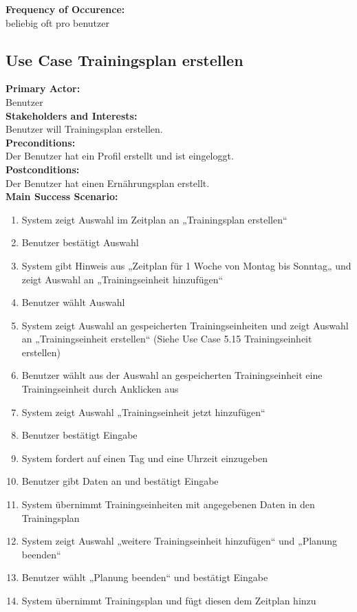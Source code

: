 \documentclass[12pt,a4paper,onecolumn]{article}
\begin{document}
\textbf{Frequency of Occurence:}\\beliebig oft pro benutzer \\

\subsection{Use Case Trainingsplan erstellen}
\textbf{Primary Actor:}\\ Benutzer\\
\textbf{Stakeholders and Interests:}\\
Benutzer will Trainingsplan erstellen.\\
\textbf{Preconditions:} \\ Der Benutzer hat ein Profil erstellt und ist eingeloggt.\\
\textbf{Postconditions:}\\Der Benutzer hat einen Ernährungsplan erstellt.\\
\textbf{Main Success Scenario:}
\begin{enumerate}
    \item System zeigt Auswahl im Zeitplan an „Trainingsplan erstellen“
    \item Benutzer bestätigt Auswahl
    \item System gibt Hinweis aus „Zeitplan für 1 Woche von Montag bis Sonntag„ und zeigt Auswahl an „Trainingseinheit hinzufügen“
    \item Benutzer wählt Auswahl 
    \item System zeigt Auswahl an gespeicherten Trainingseinheiten und zeigt Auswahl an „Trainingseinheit erstellen“ (Siehe Use Case 5.15 Trainingseinheit erstellen)
    \item Benutzer wählt aus der Auswahl an gespeicherten Trainingseinheit eine Trainingseinheit durch Anklicken aus 
    \item System zeigt Auswahl „Trainingseinheit jetzt hinzufügen“
    \item Benutzer bestätigt Eingabe
    \item System fordert auf einen Tag und eine Uhrzeit einzugeben
    \item Benutzer gibt Daten an und bestätigt Eingabe
    \item System übernimmt Trainingseinheiten mit angegebenen Daten in den Trainingsplan
    \item System zeigt Auswahl „weitere Trainingseinheit hinzufügen“ und „Planung beenden“
    \item Benutzer wählt „Planung beenden“ und bestätigt Eingabe
    \item System übernimmt Trainingsplan und fügt diesen dem Zeitplan hinzu
\end{enumerate}
\end{document}
